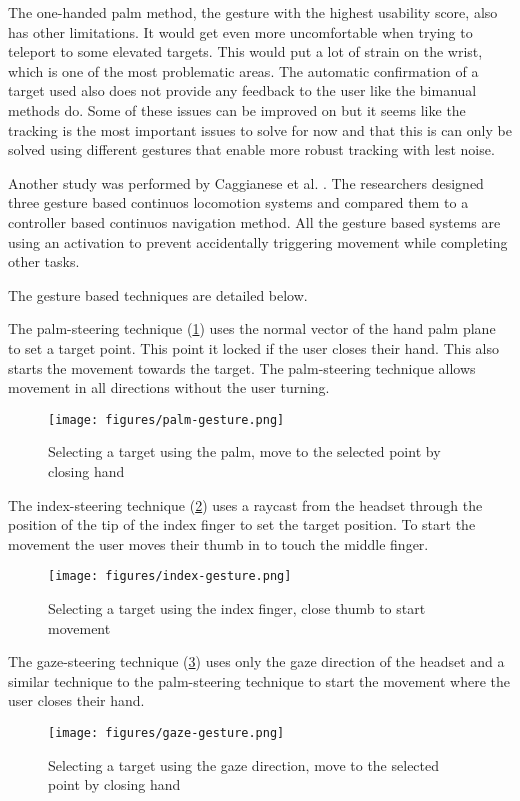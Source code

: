 The one-handed palm method, the gesture with the highest usability score, also has other limitations. It would get even more uncomfortable when trying to teleport to some elevated targets. This would put a lot of strain on the wrist, which is one of the most problematic areas. The automatic confirmation of a target used also does not provide any feedback to the user like the bimanual methods do. Some of these issues can be improved on but it seems like the tracking is the most important issues to solve for now and that this is can only be solved using different gestures that enable more robust tracking with lest noise.



Another study was performed by Caggianese et al. \cite{Caggianese}. The researchers designed three gesture based continuos locomotion systems and compared them to a controller based continuos navigation method. All the gesture based systems are using an activation to prevent accidentally triggering movement while completing other tasks.

The gesture based techniques are detailed below.

The palm-steering technique (\ref{fig:palm}) uses the normal vector of the hand palm plane to set a target point. This point it locked if the user closes their hand. This also starts the movement towards the target. The palm-steering technique allows movement in all directions without the user turning.
\begin{figure}[hbt!]
  \centering
  \texttt{[image: figures/palm-gesture.png]}
  \caption{Selecting a target using the palm, move to the selected point by closing hand}
  \label{fig:palm}
\end{figure}


The index-steering technique (\ref{fig:index}) uses a raycast from the headset through the position of the tip of the index finger to set the target position. To start the movement the user moves their thumb in to touch the middle finger.

\begin{figure}[hbt!]
  \centering
  \texttt{[image: figures/index-gesture.png]}
  \caption{Selecting a target using the index finger, close thumb to start movement}
  \label{fig:index}
\end{figure}


The gaze-steering technique (\ref{fig:gaze}) uses only the gaze direction of the headset and a similar technique to the palm-steering technique to start the movement where the user closes their hand.
\begin{figure}[hbt!]
  \centering
  \texttt{[image: figures/gaze-gesture.png]}
  \caption{Selecting a target using the gaze direction, move to the selected point by closing hand}
  \label{fig:gaze}
\end{figure}

